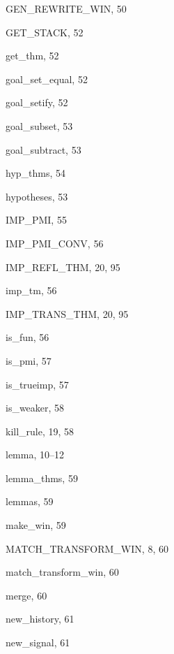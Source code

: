 \begin{theindex}
  \indexspace

  \item {\ptt GEN\_REWRITE\_WIN}, 50
  \item {\ptt GET\_STACK}, 52
  \item {\ptt get\_thm}, 52
  \item {\ptt goal\_set\_equal}, 52
  \item {\ptt goal\_setify}, 52
  \item {\ptt goal\_subset}, 53
  \item {\ptt goal\_subtract}, 53

  \indexspace

  \item {\ptt hyp\_thms}, 54
  \item {\ptt hypotheses}, 53

  \indexspace

  \item {\ptt IMP\_PMI}, 55
  \item {\ptt IMP\_PMI\_CONV}, 56
  \item {\ptt IMP\_REFL\_THM}, 20, 95
  \item {\ptt imp\_tm}, 56
  \item {\ptt IMP\_TRANS\_THM}, 20, 95
  \item {\ptt is\_fun}, 56
  \item {\ptt is\_pmi}, 57
  \item {\ptt is\_trueimp}, 57
  \item {\ptt is\_weaker}, 58

  \indexspace

  \item {\ptt kill\_rule}, 19, 58

  \indexspace

  \item lemma, 10--12
  \item {\ptt lemma\_thms}, 59
  \item {\ptt lemmas}, 59

  \indexspace

  \item {\ptt make\_win}, 59
  \item {\ptt MATCH\_TRANSFORM\_WIN}, 8, 60
  \item {\ptt match\_transform\_win}, 60
  \item {\ptt merge}, 60

  \indexspace

  \item {\ptt new\_history}, 61
  \item {\ptt new\_signal}, 61


\end{theindex}
